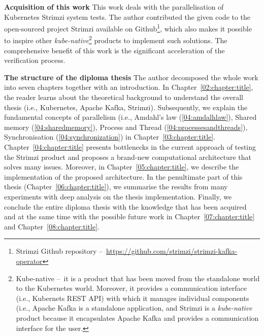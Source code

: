 \textbf{Acquisition of this work} \quad This work deals with the parallelisation of Kubernetes Strimzi system tests.
The author contributed the given code to the open-sourced project Strimzi available on Github\footnote{Strimzi Github repository \---\ \url{https://github.com/strimzi/strimzi-kafka-operator}}, which also makes it possible to inspire other \emph{kube-native}\footnote{Kube-native \---\ it is a product that has been moved from the standalone world to the Kubernetes world. Moreover, it provides a communication interface (i.e., Kubernets REST API) with which it manages individual components (i.e., Apache Kafka is a standalone application, and Strimzi is a \emph{kube-native} product because it encapsulates Apache Kafka and provides a communication interface for the user.} products to implement such solutions.
The comprehensive benefit of this work is the significant acceleration of the verification process.
\bigskip

\textbf{The structure of the diploma thesis} \quad The author decomposed the whole work into seven chapters together with an introduction.
In Chapter~\ref{02:chapter:title}, the reader learns about the theoretical background to understand the overall thesis (i.e., Kubernetes, Apache Kafka, Strimzi).
Subsequently, we explain the fundamental concepts of parallelism (i.e., Amdahl's law (\ref{04:amdalhlaw}), Shared memory (\ref{04:sharedmemory}), Process and Thread (\ref{04:processesandthreads}), Synchronisation (\ref{04:synchronization}) in Chapter~\ref{03:chapter:title}.
Chapter~\ref{04:chapter:title} presents bottlenecks in the current approach of testing the Strimzi product and proposes a brand-new computational architecture that solves many issues.
Moreover, in Chapter~\ref{05:chapter:title}, we describe the implementation of the proposed architecture.
In the penultimate part of this thesis (Chapter~\ref{06:chapter:title}), we summarise the results from many experiments with deep analysis on the thesis implementation.
Finally, we conclude the entire diploma thesis with the knowledge that has been acquired and at the same time with the possible future work in Chapter~\ref{07:chapter:title} and Chapter~\ref{08:chapter:title}.